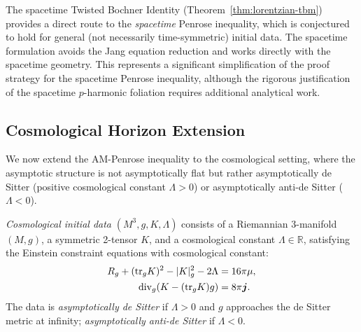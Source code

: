 \begin{remark}
The spacetime Twisted Bochner Identity (Theorem~\ref{thm:lorentzian-tbm}) provides a direct route to the \emph{spacetime} Penrose inequality, which is conjectured to hold for general (not necessarily time-symmetric) initial data. The spacetime formulation avoids the Jang equation reduction and works directly with the spacetime geometry. This represents a significant simplification of the proof strategy for the spacetime Penrose inequality, although the rigorous justification of the spacetime $p$-harmonic foliation requires additional analytical work.
\end{remark}

\subsection{Cosmological Horizon Extension}

We now extend the AM-Penrose inequality to the cosmological setting, where the asymptotic structure is not asymptotically flat but rather asymptotically de Sitter (positive cosmological constant $\Lambda > 0$) or asymptotically anti-de Sitter ($\Lambda < 0$).

\begin{definition}\label{def:cosmo-data}
\emph{Cosmological initial data} $(M^3, g, K, \Lambda)$ consists of a Riemannian 3-manifold $(M, g)$, a symmetric 2-tensor $K$, and a cosmological constant $\Lambda \in \mathbb{R}$, satisfying the Einstein constraint equations with cosmological constant:
\begin{align}
R_g + (\mathrm{tr}_g K)^2 - |K|_g^2 - 2\Lambda &= 16\pi \mu, \\
\mathrm{div}_g(K - (\mathrm{tr}_g K) g) &= 8\pi \boldsymbol{j}.
\end{align}
The data is \emph{asymptotically de Sitter} if $\Lambda > 0$ and $g$ approaches the de Sitter metric at infinity; \emph{asymptotically anti-de Sitter} if $\Lambda < 0$.
\end{definition}

